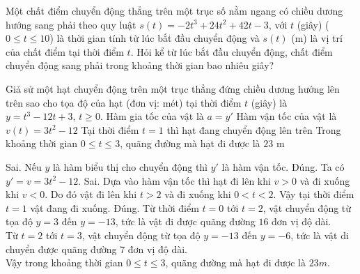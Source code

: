 \begin{bt}%
	Một chất điểm chuyển động thẳng trên một trục số nằm ngang có chiều dương hướng sang phải theo quy luật $s(t) = -2t^3 + 24t^2 + 42t - 3$, với $t$  (giây) ($0 \le t \le 10$) là thời gian tính từ lúc bắt đầu chuyển động và $s(t)$ (m) là vị trí của chất điểm tại thời điểm $t$. Hỏi kể từ lúc bắt đầu chuyển động, chất điểm chuyển động sang phải trong khoảng thời gian bao nhiêu giây?
\end{bt}

\begin{ex}%
Giả sử một hạt chuyển động trên một trục thẳng đứng chiều dương hướng lên trên sao cho tọa độ của hạt (đơn vị: mét) tại thời điểm $t$ (giây) là $y=t^3-12t+3$, $t\geq0$.
\choiceTF
{Hàm gia tốc của vật là $a=y'$}
{\True Hàm vận tốc của vật là $v(t)=3t^2-12$}
{Tại thời điểm $t=1$ thì hạt đang chuyển động lên trên}
{\True Trong khoảng thời gian $0\leq t \leq 3$, quãng đường mà hạt đi được là $23$ m}
\loigiai
{
\begin{itemchoice}
\itemch Sai. Nếu $y$ là hàm biểu thị cho chuyển động thì $y'$ là hàm vận tốc.
\itemch Đúng. Ta có $y'=v=3t^2-12$.
\itemch Sai. Dựa vào hàm vận tốc thì hạt đi lên khi $v>0$ và đi xuống khi $v<0$. Do đó vật đi lên khi $t>2$ và đi xuống khi $0<t<2$. Vậy tại thời điểm $t=1$ vật đang đi xuống.
\itemch Đúng. Từ thời điểm $t=0$ tới $t=2$, vật chuyển động từ tọa độ $y=3$ đến $y=-13$, tức là vật đi được quãng đường $16$ đơn vị độ dài. \\
Từ $t=2$ tới $t=3$, vật chuyển động từ tọa độ $y=-13$ đến $y=-6$, tức là vật di chuyển được quãng đường $7$ đơn vị độ dài. \\
Vậy trong khoảng thời gian $0\leq t \leq 3$, quãng đường mà hạt đi được là $23m$.
\end{itemchoice}
}
\end{ex}

